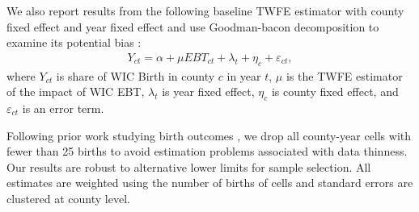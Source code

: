 We also report results from the following baseline TWFE estimator with county fixed effect and year fixed effect and use Goodman-bacon decomposition to examine its potential bias \citep{goodman2021difference}:
\begin{align*}
	Y_{ct} = \alpha + \mu EBT_{ct} + \lambda_t + \eta_c + \varepsilon_{ct},
\end{align*}
where $Y_{ct}$ is share of WIC Birth in county $c$ in year $t$, $\mu$ is the TWFE estimator of the impact of WIC EBT, $\lambda_t$ is year fixed effect, $\eta_c$ is county fixed effect, and $\varepsilon_{ct}$ is an error term.

Following prior work studying birth outcomes \citep{almond2011inside,hoynes2011can}, we drop all county-year cells with fewer than 25 births to avoid estimation problems associated with data thinness. Our results are robust to alternative lower limits for sample selection. All estimates are weighted using the number of births of cells and standard errors are clustered at county level.



